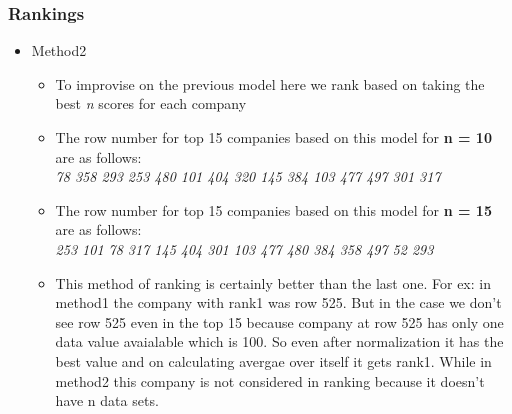 \documentclass[pdf]{beamer}
\begin{document}
\begin{frame}
	\frametitle{Rankings}
	\begin{itemize} 
		\subsection{Method2}
			\item Method2
			\begin{itemize} 
				\item To improvise on the previous model here we rank based on taking the best \textit{n} scores for each company
				\item The row number for top 15 companies based on this model for \textbf{n = 10} are as follows:\\
				\textit{78 358 293 253 480 101 404 320 145 384 103 477 497 301 317}\\
				\item The row number for top 15 companies based on this model for \textbf{n = 15} are as follows:\\
				\textit{253 101  78 317 145 404 301 103 477 480 384 358 497  52 293}\\
				\item This method of ranking is certainly better than the last one. For ex: in method1 the company with rank1 was row 525. But in the case we don't see row 525 even in the top 15 because company at row 525 has only one data value avaialable which is 100. So even after normalization it has the best value and on calculating avergae over itself it gets rank1. While in method2 this company is not considered in ranking because it doesn't have n data sets. 
			\end{itemize}
	\end{itemize}
\end{frame}
\end{document}
